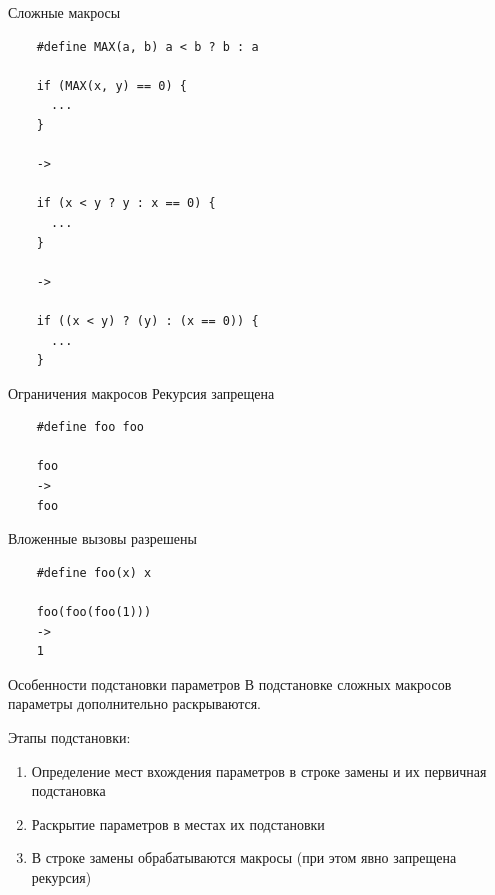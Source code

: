 \documentclass[unknownkeysallowed,xcolor=table]{beamer}
\begin{document}
\begin{frame}[fragile]{Сложные макросы}
  \begin{lstlisting}
    #define MAX(a, b) a < b ? b : a

    if (MAX(x, y) == 0) {
      ...
    }

    ->

    if (x < y ? y : x == 0) {
      ...
    }

    ->

    if ((x < y) ? (y) : (x == 0)) {
      ...
    }
  \end{lstlisting}
\end{frame}

\begin{frame}[fragile]{Ограничения макросов}
  Рекурсия запрещена

  \begin{lstlisting}
    #define foo foo

    foo
    ->
    foo
  \end{lstlisting}

  \vspace{2em}

  Вложенные вызовы разрешены

  \begin{lstlisting}
    #define foo(x) x

    foo(foo(foo(1)))
    ->
    1
  \end{lstlisting}
\end{frame}

\begin{frame}{Особенности подстановки параметров}
  В подстановке сложных макросов параметры дополнительно раскрываются.

  \vspace{1em}

  Этапы подстановки:

  \vspace{0.5em}

  \begin{enumerate}
    \item Определение мест вхождения параметров в строке замены и их первичная подстановка \vspace{0.7em}
    \item Раскрытие параметров в местах их подстановки \vspace{0.7em}
    \item В строке замены обрабатываются макросы (при этом явно запрещена рекурсия)
  \end{enumerate}
\end{frame}
\end{document}
